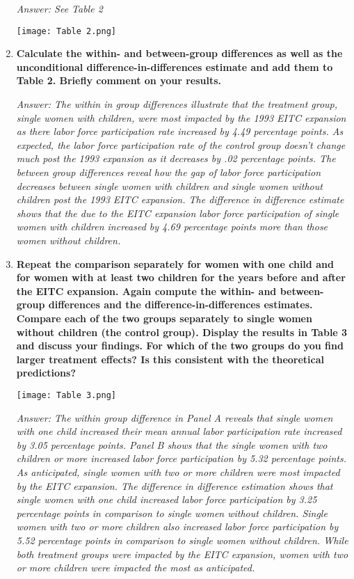 \documentclass{article}
\begin{document}
\begin{enumerate}
\textit{Answer: See Table 2 }

\texttt{[image: Table 2.png]}



\item \textbf{  Calculate the within- and between-group differences as well as the unconditional difference-in-differences estimate and add them to Table 2. Briefly comment on your results. }


\textit{Answer: The within in group differences illustrate that the treatment group, single women with children, were most impacted by the 1993 EITC expansion as there labor force participation rate increased by 4.49 percentage points. As expected, the labor force participation rate of the control group doesn’t change much post the 1993 expansion as it decreases by .02 percentage points. The between group differences reveal how the gap of labor force participation decreases between single women with children and single women without children post the 1993 EITC expansion. The difference in difference estimate shows that the due to the EITC expansion labor force participation of single women with children increased by 4.69 percentage points more than those women without children.  }

\item \textbf{ Repeat the comparison separately for women with one child and for women with at least two children for the years before and after the EITC expansion. Again compute the within- and between-group differences and the difference-in-differences estimates. Compare each of the two groups separately to single women without children (the control group). Display the results in Table 3 and discuss your findings. For which of the two groups do you find larger treatment effects? Is this consistent with the theoretical predictions?  }

\texttt{[image: Table 3.png]}


\textit{Answer: The within group difference in Panel A reveals that single women with one child increased their mean annual labor participation rate increased by 3.05 percentage points. Panel B shows that the single women with two children or more increased labor force participation by 5.32 percentage points. As anticipated, single women with two or more children were most impacted by the EITC expansion. The difference in difference estimation shows that single women with one child increased labor force participation by 3.25 percentage points in comparison to single women without children. Single women with two or more children also increased labor force participation by 5.52 percentage points in comparison to single women without children. While both treatment groups were impacted by the EITC expansion, women with two or more children were impacted the most as anticipated.  }


\end{enumerate}
\end{document}
